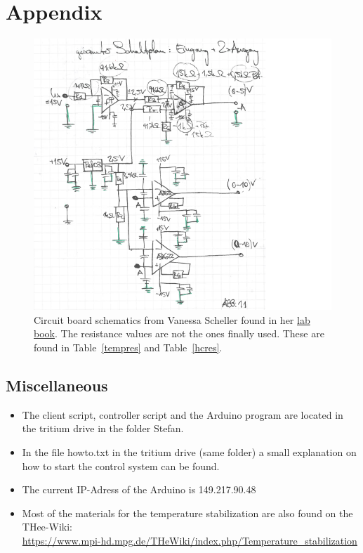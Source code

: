 \documentclass[12pt]{scrartcl}
\begin{document}
  \newpage
  \section{Appendix}
    \begin{figure}[H]
      \centering
      \includegraphics[width = \textwidth]{schaltplanvan.png}
      \caption{Circuit board schematics from Vanessa Scheller found in her
      \href{https://www.mpi-hd.mpg.de/THeWiki/index.php/Temperature_stabilization}{lab book}.
      The resistance values are not the ones finally used. These are found in
      Table~\ref{tempres} and Table~\ref{hcres}.}
      \label{fig20}
    \end{figure}
    \subsection{Miscellaneous}
      \begin{itemize}
        \item The client script, controller script and the Arduino program are located in
              the tritium drive in the folder Stefan.
        \item In the file howto.txt in the tritium drive (same folder) a small explanation
              on how to start the control system can be found.
        \item The current IP-Adress of the Arduino is 149.217.90.48
        \item Most of the materials for the temperature stabilization
              are also found on the THee-Wiki: \\
              \url{https://www.mpi-hd.mpg.de/THeWiki/index.php/Temperature_stabilization}
      \end{itemize}
\end{document}
